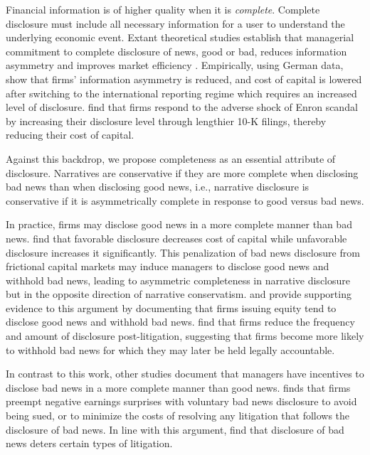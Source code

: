 \documentclass[letterpaper,12pt]{article}
\begin{document}
\begin{spacing}{1.5}
\noindent Financial information is of higher quality when it is \textit{complete}. Complete disclosure must include all necessary information for a user to understand the underlying economic event. Extant theoretical studies establish that managerial commitment to complete disclosure of news, good or bad, reduces information asymmetry and improves market efficiency \cite{glostenBidAskTransaction1985, diamondOptimalReleaseInformation1985, diamondDisclosureLiquidityCost1991, baimanRelationCapitalMarkets1996}. Empirically, using German data,  show that firms' information asymmetry is reduced, and cost of capital is lowered after switching to the international reporting regime which requires an increased level of disclosure.  find that firms respond to the adverse shock of Enron scandal by increasing their disclosure level through lengthier 10-K filings, thereby reducing their cost of capital. 

Against this backdrop, we propose completeness as an essential attribute of disclosure. Narratives are conservative if they are more complete when disclosing bad news than when disclosing good news, i.e., narrative disclosure is conservative if it is asymmetrically complete in response to good versus bad news. 

In practice, firms may disclose good news in a more complete manner than bad news.  find that favorable disclosure decreases cost of capital while unfavorable disclosure increases it significantly. This penalization of bad news disclosure from frictional capital markets may induce managers to disclose good news and withhold bad news, leading to asymmetric completeness in narrative disclosure but in the opposite direction of narrative conservatism.  and  provide supporting evidence to this argument by documenting that firms issuing equity tend to disclose good news and withhold bad news.  find that firms reduce the frequency and amount of disclosure post-litigation, suggesting that firms become more likely to withhold bad news for which they may later be held legally accountable. 

In contrast to this work, other studies document that managers have incentives to disclose bad news in a more complete manner than good news.  finds that firms preempt negative earnings surprises with voluntary bad news disclosure to avoid being sued, or to minimize the costs of resolving any litigation that follows the disclosure of bad news. In line with this argument,  find that disclosure of bad news deters certain types of litigation. 


\end{spacing}
\end{document}
